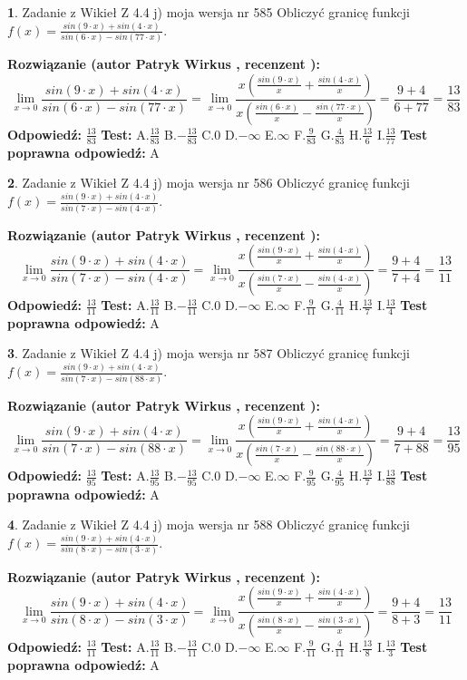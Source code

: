 \documentclass[12pt, a4paper]{article}
\theoremstyle{definition} %
\newtheorem{zad}{}
\newcommand{\zadStart}[1]{\begin{zad}#1\newline}
\newcommand{\zadStop}{\end{zad}}
\newcommand{\rozwStart}[2]{\noindent \textbf{Rozwiązanie (autor #1 , recenzent #2): }\newline}
\newcommand{\rozwStop}{\newline}
\newcommand{\odpStart}{\noindent \textbf{Odpowiedź:}\newline}
\newcommand{\odpStop}{\newline}
\newcommand{\testStart}{\noindent \textbf{Test:}\newline}
\newcommand{\testStop}{\newline}
\newcommand{\kluczStart}{\noindent \textbf{Test poprawna odpowiedź:}\newline}
\newcommand{\kluczStop}{\newline}
\begin{document}
\zadStart{Zadanie z Wikieł Z 4.4 j) moja wersja nr 585}
Obliczyć granicę funkcji $f(x)=\frac{sin(9\cdot x) +sin(4\cdot x)}{sin(6\cdot x) -sin(77\cdot x)}$.
\zadStop
\rozwStart{Patryk Wirkus}{}
$$\lim\limits_{x\to 0}\frac{sin(9\cdot x) +sin(4\cdot x)}{sin(6\cdot x) -sin(77\cdot x)}=\lim\limits_{x\to 0}\frac{x(\frac{sin(9\cdot x)}{x}+\frac{sin(4\cdot x)}{x})}{x(\frac{sin(6\cdot x)}{x}-\frac{sin(77\cdot x)}{x})}=\frac{9+4}{6+77} = \frac{13}{83}$$
\rozwStop
\odpStart
$\frac{13}{83}$
\odpStop
\testStart
A.$\frac{13}{83}$
B.$-\frac{13}{83}$
C.$0$
D.$-\infty$
E.$\infty$
F.$\frac{9}{83}$
G.$\frac{4}{83}$
H.$\frac{13}{6}$
I.$\frac{13}{77}$
\testStop
\kluczStart
A
\kluczStop



\zadStart{Zadanie z Wikieł Z 4.4 j) moja wersja nr 586}
Obliczyć granicę funkcji $f(x)=\frac{sin(9\cdot x) +sin(4\cdot x)}{sin(7\cdot x) -sin(4\cdot x)}$.
\zadStop
\rozwStart{Patryk Wirkus}{}
$$\lim\limits_{x\to 0}\frac{sin(9\cdot x) +sin(4\cdot x)}{sin(7\cdot x) -sin(4\cdot x)}=\lim\limits_{x\to 0}\frac{x(\frac{sin(9\cdot x)}{x}+\frac{sin(4\cdot x)}{x})}{x(\frac{sin(7\cdot x)}{x}-\frac{sin(4\cdot x)}{x})}=\frac{9+4}{7+4} = \frac{13}{11}$$
\rozwStop
\odpStart
$\frac{13}{11}$
\odpStop
\testStart
A.$\frac{13}{11}$
B.$-\frac{13}{11}$
C.$0$
D.$-\infty$
E.$\infty$
F.$\frac{9}{11}$
G.$\frac{4}{11}$
H.$\frac{13}{7}$
I.$\frac{13}{4}$
\testStop
\kluczStart
A
\kluczStop



\zadStart{Zadanie z Wikieł Z 4.4 j) moja wersja nr 587}
Obliczyć granicę funkcji $f(x)=\frac{sin(9\cdot x) +sin(4\cdot x)}{sin(7\cdot x) -sin(88\cdot x)}$.
\zadStop
\rozwStart{Patryk Wirkus}{}
$$\lim\limits_{x\to 0}\frac{sin(9\cdot x) +sin(4\cdot x)}{sin(7\cdot x) -sin(88\cdot x)}=\lim\limits_{x\to 0}\frac{x(\frac{sin(9\cdot x)}{x}+\frac{sin(4\cdot x)}{x})}{x(\frac{sin(7\cdot x)}{x}-\frac{sin(88\cdot x)}{x})}=\frac{9+4}{7+88} = \frac{13}{95}$$
\rozwStop
\odpStart
$\frac{13}{95}$
\odpStop
\testStart
A.$\frac{13}{95}$
B.$-\frac{13}{95}$
C.$0$
D.$-\infty$
E.$\infty$
F.$\frac{9}{95}$
G.$\frac{4}{95}$
H.$\frac{13}{7}$
I.$\frac{13}{88}$
\testStop
\kluczStart
A
\kluczStop



\zadStart{Zadanie z Wikieł Z 4.4 j) moja wersja nr 588}
Obliczyć granicę funkcji $f(x)=\frac{sin(9\cdot x) +sin(4\cdot x)}{sin(8\cdot x) -sin(3\cdot x)}$.
\zadStop
\rozwStart{Patryk Wirkus}{}
$$\lim\limits_{x\to 0}\frac{sin(9\cdot x) +sin(4\cdot x)}{sin(8\cdot x) -sin(3\cdot x)}=\lim\limits_{x\to 0}\frac{x(\frac{sin(9\cdot x)}{x}+\frac{sin(4\cdot x)}{x})}{x(\frac{sin(8\cdot x)}{x}-\frac{sin(3\cdot x)}{x})}=\frac{9+4}{8+3} = \frac{13}{11}$$
\rozwStop
\odpStart
$\frac{13}{11}$
\odpStop
\testStart
A.$\frac{13}{11}$
B.$-\frac{13}{11}$
C.$0$
D.$-\infty$
E.$\infty$
F.$\frac{9}{11}$
G.$\frac{4}{11}$
H.$\frac{13}{8}$
I.$\frac{13}{3}$
\testStop
\kluczStart
A
\kluczStop
\end{document}
